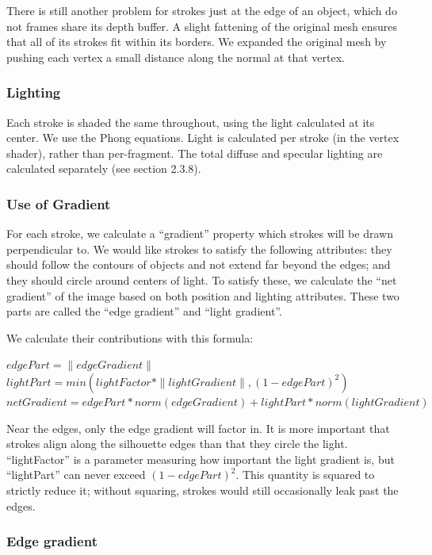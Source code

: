 \documentclass[conference]{acmsiggraph}
\begin{document}
There is still another problem for strokes just at the edge of an object, which
do not frames share its depth buffer. A slight fattening of the original mesh
ensures that all of its strokes fit within its borders. We expanded the
original mesh by pushing each vertex a small distance along the normal at that
vertex.

\subsubsection{Lighting}

Each stroke is shaded the same throughout, using the light calculated at its
center. We use the Phong equations. Light is calculated per stroke (in the
vertex shader), rather than per-fragment. The total diffuse and specular
lighting are calculated separately (see section 2.3.8).


\subsubsection{Use of Gradient}

For each stroke, we calculate a ``gradient'' property which strokes will be
drawn perpendicular to. We would like strokes to satisfy the following
attributes: they should follow the contours of objects and not extend far
beyond the edges; and they should circle around centers of light. To satisfy
these, we calculate the ``net gradient'' of the image based on both position
and lighting attributes. These two parts are called the ``edge gradient'' and
``light gradient''.

We calculate their contributions with this formula:

  $edgePart = \| edgeGradient \|$ \\
  $lightPart = min(lightFactor * \| lightGradient \| , (1 - edgePart)^2)$ \\
  $netGradient = edgePart * norm(edgeGradient) + lightPart * norm(lightGradient)$

Near the edges, only the edge gradient will factor in. It is more important
that strokes align along the silhouette edges than that they circle the light.
``lightFactor'' is a parameter measuring how important the light gradient is,
but ``lightPart'' can never exceed $(1 - edgePart)^2$. This quantity is squared
to strictly reduce it; without squaring, strokes would still occasionally leak
past the edges.


\subsubsection{Edge gradient}
\end{document}
